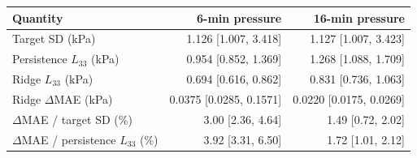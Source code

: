 \begin{tabular}{@{}lrr@{}}
\toprule
Quantity & 6-min pressure & 16-min pressure \\
\midrule
Target SD (kPa) & 1.126 [1.007, 3.418] & 1.127 [1.007, 3.423] \\
Persistence $L_{33}$ (kPa) & 0.954 [0.852, 1.369] & 1.268 [1.088, 1.709] \\
Ridge $L_{33}$ (kPa) & 0.694 [0.616, 0.862] & 0.831 [0.736, 1.063] \\
Ridge $\Delta$MAE (kPa) & 0.0375 [0.0285, 0.1571] & 0.0220 [0.0175, 0.0269] \\
$\Delta$MAE / target SD (\%) & 3.00 [2.36, 4.64] & 1.49 [0.72, 2.02] \\
$\Delta$MAE / persistence $L_{33}$ (\%) & 3.92 [3.31, 6.50] & 1.72 [1.01, 2.12] \\
\bottomrule
\end{tabular}
